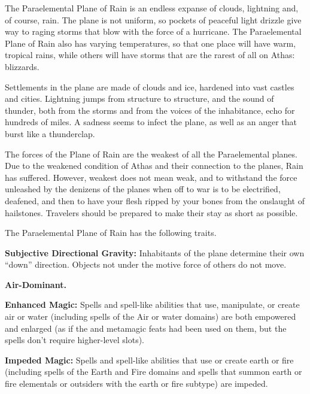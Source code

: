 The Paraelemental Plane of Rain is an endless expanse of clouds, lightning and, of course, rain. The plane is not uniform, so pockets of peaceful light drizzle give way to raging storms that blow with the force of a hurricane. The Paraelemental Plane of Rain also has varying temperatures, so that one place will have warm, tropical rains, while others will have storms that are the rarest of all on Athas: blizzards.

Settlements in the plane are made of clouds and ice, hardened into vast castles and cities. Lightning jumps from structure to structure, and the sound of thunder, both from the storms and from the voices of the inhabitance, echo for hundreds of miles. A sadness seems to infect the plane, as well as an anger that burst like a thunderclap.

The forces of the Plane of Rain are the weakest of all the Paraelemental planes. Due to the weakened condition of Athas and their connection to the planes, Rain has suffered. However, weakest does not mean weak, and to withstand the force unleashed by the denizens of the planes when off to war is to be electrified, deafened, and then to have your flesh ripped by your bones from the onslaught of hailstones. Travelers should be prepared to make their stay as short as possible.

The Paraelemental Plane of Rain has the following traits.
\begin{itemize*}
\item \textbf{Subjective Directional Gravity:} Inhabitants of the plane determine their own ``down'' direction. Objects not under the motive force of others do not move.
\item \textbf{Air-Dominant.}
\item \textbf{Enhanced Magic:} Spells and spell-like abilities that use, manipulate, or create air or water (including spells of the Air or water domains) are both empowered and enlarged (as if the  and  metamagic feats had been used on them, but the spells don't require higher-level slots).
\item \textbf{Impeded Magic:} Spells and spell-like abilities that use or create earth or fire (including spells of the Earth and Fire domains and spells that summon earth or fire elementals or outsiders with the earth or fire subtype) are impeded.
\end{itemize*}

